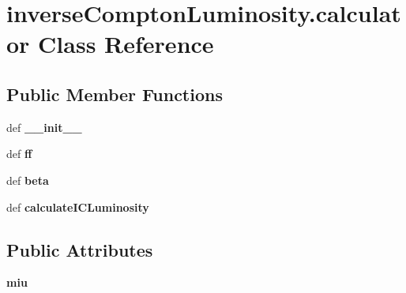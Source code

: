 \hypertarget{classinverseComptonLuminosity_1_1calculator}{\section{inverse\-Compton\-Luminosity.\-calculator Class Reference}
\label{classinverseComptonLuminosity_1_1calculator}
}
\subsection*{Public Member Functions}
\begin{DoxyCompactItemize}
\item 
\hypertarget{classinverseComptonLuminosity_1_1calculator_a9b2af9df39e5adffa1c096fe0ecdd1a4}{def {\bfseries \-\_\-\-\_\-init\-\_\-\-\_\-}}\label{classinverseComptonLuminosity_1_1calculator_a9b2af9df39e5adffa1c096fe0ecdd1a4}

\item 
\hypertarget{classinverseComptonLuminosity_1_1calculator_a70af46657359e2904cfdf145666c7c63}{def {\bfseries ff}}\label{classinverseComptonLuminosity_1_1calculator_a70af46657359e2904cfdf145666c7c63}

\item 
\hypertarget{classinverseComptonLuminosity_1_1calculator_a23634c54f681bb221263ccc233933b5e}{def {\bfseries beta}}\label{classinverseComptonLuminosity_1_1calculator_a23634c54f681bb221263ccc233933b5e}

\item 
\hypertarget{classinverseComptonLuminosity_1_1calculator_aabbdbf7b2ae6f421c9469538b3b7bee4}{def {\bfseries calculate\-I\-C\-Luminosity}}\label{classinverseComptonLuminosity_1_1calculator_aabbdbf7b2ae6f421c9469538b3b7bee4}

\end{DoxyCompactItemize}
\subsection*{Public Attributes}
\begin{DoxyCompactItemize}
\item 
\hypertarget{classinverseComptonLuminosity_1_1calculator_a8a28e6f458cda687728a5a6d90b6c37f}{{\bfseries miu}}\label{classinverseComptonLuminosity_1_1calculator_a8a28e6f458cda687728a5a6d90b6c37f}

\end{DoxyCompactItemize}
